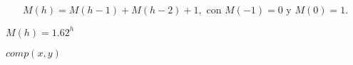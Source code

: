 \documentclass{article}
\begin{document}
\[ M(h) = M(h-1)+M(h-2) +1, \mbox{ con } M(-1) = 0 \mbox{ y } M(0) = 1. \]
\pagebreak

$M(h) = 1.62^h$
\pagebreak

$ comp(x,y) $
\pagebreak
\end{document}
